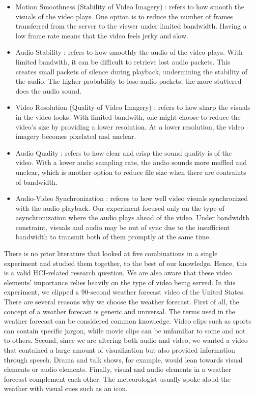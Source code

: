 \begin{itemize}
    \item Motion Smoothness (Stability of Video Imagery) \cite{claypool1999effects}: refers to how smooth the visuals of the video plays. One option is to reduce the number of frames transferred from the server to the viewer under limited bandwidth. Having a low frame rate means that the video feels jerky and slow.
    \item Audio Stability \cite{claypool1999effects}: refers to how smoothly the audio of the video plays. With limited bandwith, it can be difficult to retrieve lost audio packets. This creates small packets of silence during playback, undermining the stability of the audio. The higher probability to lose audio packets, the more stuttered does the audio sound.
    \item Video Resolution (Quality of Video Imagery) \cite{oeldorf2012bad, knoche2008low}: refers to how sharp the visuals in the video looks. With limited bandwith, one might choose to reduce the video's size by providing a lower resolution. At a lower resolution, the video imagery becomes pixelated and unclear. 
    \item Audio Quality \cite{oeldorf2012bad, noll1993wideband}: refers to how clear and crisp the sound quality is of the video. With a lower audio sampling rate, the audio sounds more muffled and unclear, which is another option to reduce file size when there are contraints of bandwidth.
    \item Audio-Video Synchronization \cite{steinmetz1996human}: referes to how well video visuals synchronized with the audio playback. Our experiment focused only on the type of asynchronization where the audio plays ahead of the video. Under bandwidth constraint, visuals and audio may be out of sync due to the insufficient bandwidth to transmit both of them promptly at the same time.
\end{itemize}

There is no prior literature that looked at five combinations in a single experiment and studied them together, to the best of our knowledge. Hence, this is a valid HCI-related research question. We are also aware that these video elements' importance relies heavily on the type of video being served. In this experiment, we clipped a 90-second weather forecast video of the United States. There are several reasons why we choose the weather forecast. First of all, the concept of a weather forecast is generic and universal. The terms used in the weather forecast can be considered common knowledge. Video clips such as sports can contain specific jargon, while movie clips can be unfamiliar to some and not to others. Second, since we are altering both audio and video, we wanted a video that contained a large amount of visualization but also provided information through speech. Drama and talk shows, for example, would lean towards visual elements or audio elements. Finally, visual and audio elements in a weather forecast complement each other. The meteorologist usually spoke aloud the weather with visual cues such as an icon.

